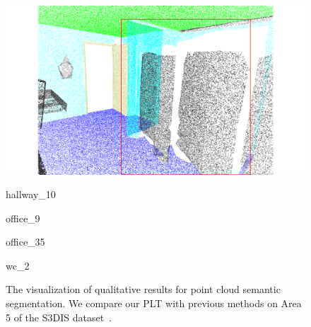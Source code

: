 \begin{figure}[htbp]
\begin{minipage}{0.22\textwidth}
    \end{minipage}
    \hfill
    \begin{minipage}{0.22\textwidth}
        \centering
        \includegraphics[width=\textwidth]{fig/supplement/semantic_segmentation/wc_2/GT_wc_2.pdf}
    \end{minipage}
    \hfill
    
    \vspace{0.5em}
    \begin{minipage}{0.1\textwidth} %
        \color{white}{12}
    \end{minipage}
    \hfill
    \begin{minipage}{0.22\textwidth} %
        \centering
        hallway\_10
    \end{minipage}
    \hfill
    \begin{minipage}{0.22\textwidth} %
        \centering
        office\_9
    \end{minipage}
    \hfill
    \begin{minipage}{0.22\textwidth} %
        \centering
        office\_35
    \end{minipage}
    \hfill
    \begin{minipage}{0.22\textwidth} %
        \centering
        wc\_2
    \end{minipage}
    \hfill
    \caption{The visualization of qualitative results for point cloud semantic segmentation. We compare our PLT with previous methods on Area 5 of the S3DIS dataset~\cite{armeni20163d}.}
    \label{fig:semantic}

\end{figure}

